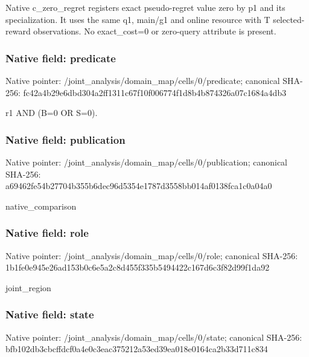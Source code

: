 \documentclass[10pt,a4paper]{article}
\begin{document}
\begingroup\raggedright\sloppy Native c\_\allowbreak{}zero\_\allowbreak{}regret registers exact pseudo-regret value zero by p1 and its specialization. It uses the same q1,\allowbreak{} main/\allowbreak{}g1 and online resource with T selected-reward observations. No exact\_\allowbreak{}cost=\allowbreak{}0 or zero-query attribute is present.\par\endgroup

\subsubsection{Native field: predicate}
Native pointer: /joint\_\allowbreak{}analysis/domain\_\allowbreak{}map/cells/0/predicate; canonical SHA-256: fc42a4b29e6dbd304a2ff1311c67f10f006774f1d8b4b874326a07c1684a4db3

\begingroup\raggedright\sloppy r1 AND (B=\allowbreak{}0 OR S=\allowbreak{}0).\par\endgroup

\subsubsection{Native field: publication}
Native pointer: /joint\_\allowbreak{}analysis/domain\_\allowbreak{}map/cells/0/publication; canonical SHA-256: a69462fe54b27704b355b6dec96d5354e1787d3558bb014af0138fca1c0a04a0

\begingroup\raggedright\sloppy native\_\allowbreak{}comparison\par\endgroup

\subsubsection{Native field: role}
Native pointer: /joint\_\allowbreak{}analysis/domain\_\allowbreak{}map/cells/0/role; canonical SHA-256: 1b1fe0e945e26ad153b0c6e5a2c8d455f335b5494422c167d6c3f82d99f1da92

\begingroup\raggedright\sloppy joint\_\allowbreak{}region\par\endgroup

\subsubsection{Native field: state}
Native pointer: /joint\_\allowbreak{}analysis/domain\_\allowbreak{}map/cells/0/state; canonical SHA-256: bfb102db3cbcffdcf0a4e0c3eac375212a53ed39ea018e0164ca2b33d711c834
\end{document}
